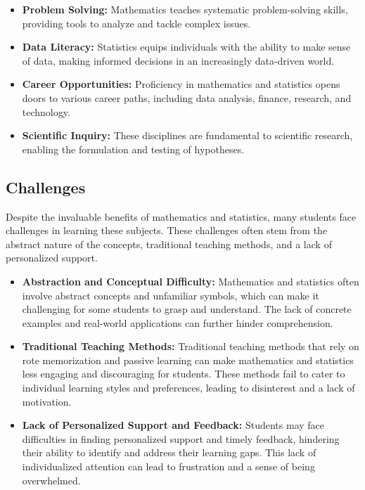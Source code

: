 \documentclass[20pt]{report}
\begin{document}
\begin{itemize}
    \item \textbf{Problem Solving:} Mathematics teaches systematic problem-solving skills, providing tools to analyze and tackle complex issues.
    \item \textbf{Data Literacy:} Statistics equips individuals with the ability to make sense of data, making informed decisions in an increasingly data-driven world.
    \item \textbf{Career Opportunities:} Proficiency in mathematics and statistics opens doors to various career paths, including data analysis, finance, research, and technology.
    \item \textbf{Scientific Inquiry:} These disciplines are fundamental to scientific research, enabling the formulation and testing of hypotheses.
\end{itemize}
\subsection{Challenges}

Despite the invaluable benefits of mathematics and statistics, many students face challenges in learning these subjects. These challenges often stem from the abstract nature of the concepts, traditional teaching methods, and a lack of personalized support.

\begin{itemize}

\item \textbf{Abstraction and Conceptual Difficulty:} Mathematics and statistics often involve abstract concepts and unfamiliar symbols, which can make it challenging for some students to grasp and understand. The lack of concrete examples and real-world applications can further hinder comprehension.

\item \textbf{Traditional Teaching Methods:} Traditional teaching methods that rely on rote memorization and passive learning can make mathematics and statistics less engaging and discouraging for students. These methods fail to cater to individual learning styles and preferences, leading to disinterest and a lack of motivation.

\item \textbf{Lack of Personalized Support and Feedback:} Students may face difficulties in finding personalized support and timely feedback, hindering their ability to identify and address their learning gaps. This lack of individualized attention can lead to frustration and a sense of being overwhelmed.
\end{itemize}
\end{document}
